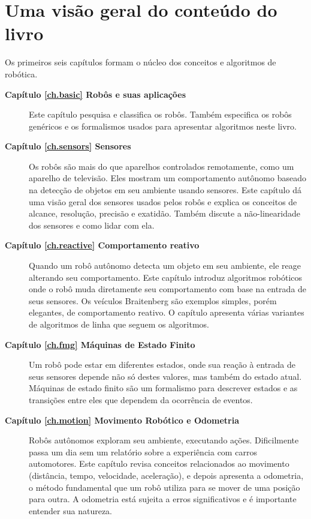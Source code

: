 \section{Uma visão geral do conteúdo do livro}\label{s.overview}

Os primeiros seis capítulos formam o núcleo dos conceitos e algoritmos de robótica.
\begin{description}
\item [\textbf{Capítulo \ref{ch.basic} Robôs e suas aplicações}] Este capítulo pesquisa e classifica os robôs. Também especifica os robôs genéricos e os formalismos usados para apresentar algoritmos neste livro.

\item [\textbf{Capítulo \ref{ch.sensors} Sensores}] Os robôs são mais do que aparelhos controlados remotamente, como um aparelho de televisão. Eles mostram um comportamento autônomo baseado na detecção de objetos em seu ambiente usando sensores. Este capítulo dá uma visão geral dos sensores usados pelos robôs e explica os conceitos de alcance, resolução, precisão e exatidão. Também discute a não-linearidade dos sensores e como lidar com ela.

\item [\textbf{Capítulo \ref{ch.reactive} Comportamento reativo}] Quando um robô autônomo detecta um objeto em seu ambiente, ele reage alterando seu comportamento. Este capítulo introduz algoritmos robóticos onde o robô muda diretamente seu comportamento com base na entrada de seus sensores. Os veículos Braitenberg são exemplos simples, porém elegantes, de comportamento reativo. O capítulo apresenta várias variantes de algoritmos de linha que seguem os algoritmos.

\item [\textbf{Capítulo \ref{ch.fmg} Máquinas de Estado Finito}] Um robô pode estar em diferentes estados, onde sua reação à entrada de seus sensores depende não só destes valores, mas também do estado atual. Máquinas de estado finito são um formalismo para descrever estados e as transições entre eles que dependem da ocorrência de eventos.

\item [\textbf{Capítulo \ref{ch.motion} Movimento Robótico e Odometria}] Robôs autônomos exploram seu ambiente, executando ações. Dificilmente passa um dia sem um relatório sobre a experiência com carros automotores. Este capítulo revisa conceitos relacionados ao movimento (distância, tempo, velocidade, aceleração), e depois apresenta a odometria, o método fundamental que um robô utiliza para se mover de uma posição para outra. A odometria está sujeita a erros significativos e é importante entender sua natureza.


\end{description}
